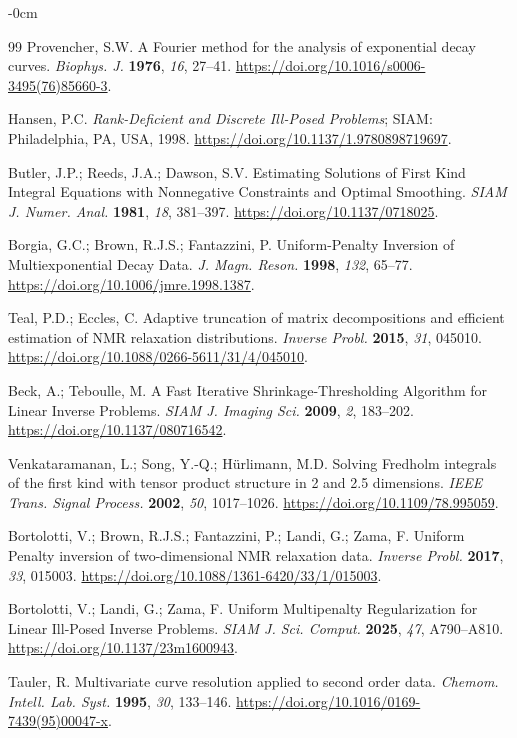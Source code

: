 \documentclass[mathematics,article,accept,moreauthors]{Definitions/mdpi}
\begin{document}
\begin{adjustwidth}{-\extralength}{0cm}
\begin{thebibliography}{99}
Provencher, S.W. A Fourier method for the analysis of exponential decay curves. \emph{Biophys. J.} \textbf{1976}, \emph{16}, 27--41. \url{https://doi.org/10.1016/s0006-3495(76)85660-3}.

Hansen, P.C. \emph{Rank-Deficient and Discrete Ill-Posed Problems}; SIAM: Philadelphia, PA, USA, 1998. \url{https://doi.org/10.1137/1.9780898719697}.

Butler, J.P.; Reeds, J.A.; Dawson, S.V. Estimating Solutions of First Kind Integral Equations with Nonnegative Constraints and Optimal Smoothing. \emph{SIAM J. Numer. Anal.} \textbf{1981}, \emph{18}, 381--397. \url{https://doi.org/10.1137/0718025}.

Borgia, G.C.; Brown, R.J.S.; Fantazzini, P. Uniform-Penalty Inversion of Multiexponential Decay Data. \emph{J. Magn. Reson.} \textbf{1998}, \emph{132}, 65--77. \url{https://doi.org/10.1006/jmre.1998.1387}.

Teal, P.D.; Eccles, C. Adaptive truncation of matrix decompositions and efficient estimation of NMR relaxation distributions. \emph{Inverse Probl.} \textbf{2015}, \emph{31}, 045010. \url{https://doi.org/10.1088/0266-5611/31/4/045010}.

Beck, A.; Teboulle, M. A Fast Iterative Shrinkage-Thresholding Algorithm for Linear Inverse Problems. \emph{SIAM J. Imaging Sci.} \textbf{2009}, \emph{2}, 183--202. \url{https://doi.org/10.1137/080716542}.

Venkataramanan, L.; Song, Y.-Q.; Hürlimann, M.D. Solving Fredholm integrals of the first kind with tensor product structure in 2 and 2.5 dimensions. \emph{IEEE Trans. Signal Process.} \textbf{2002}, \emph{50}, 1017--1026. \url{https://doi.org/10.1109/78.995059}.

Bortolotti, V.; Brown, R.J.S.; Fantazzini, P.; Landi, G.; Zama, F. Uniform Penalty inversion of two-dimensional NMR relaxation data. \emph{Inverse Probl.} \textbf{2017}, \emph{33}, 015003. \url{https://doi.org/10.1088/1361-6420/33/1/015003}.

Bortolotti, V.; Landi, G.; Zama, F. Uniform Multipenalty Regularization for Linear Ill-Posed Inverse Problems. \emph{SIAM J. Sci. Comput.} \textbf{2025}, \emph{47}, A790--A810. \url{https://doi.org/10.1137/23m1600943}.

Tauler, R. Multivariate curve resolution applied to second order data. \emph{Chemom. Intell. Lab. Syst.} \textbf{1995}, \emph{30}, 133--146. \url{https://doi.org/10.1016/0169-7439(95)00047-x}.


\end{thebibliography}
\end{adjustwidth}
\end{document}
